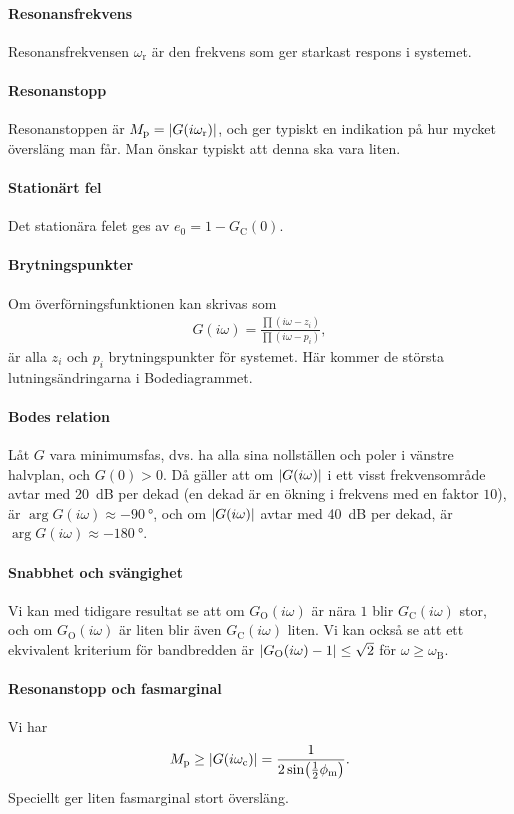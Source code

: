 \paragraph{Resonansfrekvens}
Resonansfrekvensen $\omega_{\text{r}}$ är den frekvens som ger starkast respons i systemet.

\paragraph{Resonanstopp}
Resonanstoppen är $M_{\text{p}} = \abs{G(i\omega_{\text{r}})}$, och ger typiskt en indikation på hur mycket översläng man får. Man önskar typiskt att denna ska vara liten.

\paragraph{Stationärt fel}
Det stationära felet ges av $e_{0} = 1 - G_{\text{C}}(0)$.

\paragraph{Brytningspunkter}
Om överförningsfunktionen kan skrivas som
\begin{align*}
	G(i\omega) = \frac{\prod(i\omega - z_{i})}{\prod(i\omega - p_{i})},
\end{align*}
är alla $z_{i}$ och $p_{i}$ brytningspunkter för systemet. Här kommer de största lutningsändringarna i Bodediagrammet.

\paragraph{Bodes relation}
Låt $G$ vara minimumsfas, dvs. ha alla sina nollställen och poler i vänstre halvplan, och $G(0) > 0$. Då gäller att om $\abs{G(i\omega)}$ i ett visst frekvensområde avtar med \SI{20}{\deci\bel} per dekad (en dekad är en ökning i frekvens med en faktor $10$), är $\arg{G(i\omega)}\approx \SI{-90}{\degree}$, och om $\abs{G(i\omega)}$ avtar med \SI{40}{\deci\bel} per dekad, är $\arg{G(i\omega)}\approx \SI{-180}{\degree}$.

\paragraph{Snabbhet och svängighet}
Vi kan med tidigare resultat se att om $G_{\text{O}}(i\omega)$ är nära $1$ blir $G_{\text{C}}(i\omega)$ stor, och om $G_{\text{O}}(i\omega)$ är liten blir även $G_{\text{C}}(i\omega)$ liten. Vi kan också se att ett ekvivalent kriterium för bandbredden är $\abs{G_{\text{O}}(i\omega) - 1} \leq \sqrt{2}$ för $\omega \geq \omega_{\text{B}}$.

\paragraph{Resonanstopp och fasmarginal}
Vi har
\begin{align*}
	M_{\text{p}} \geq \abs{G(i\omega_{\text{c}})} = \frac{1}{2\sin(\frac{1}{2}\phi_{\text{m}})}.
\end{align*}
Speciellt ger liten fasmarginal stort översläng.